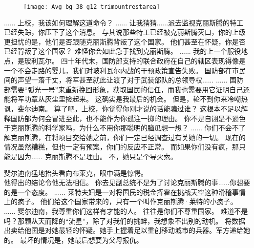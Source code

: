 \documentclass[openany]{book}
\begin{document}
\begin{figure}[h]
    \centering
    \texttt{[image: Avg\_bg\_38\_g12\_trimountrestarea]}
\end{figure}
\begin{dialogue}
     ......
     上校，我该如何理解这道命令？
     ......
     让我猜猜......派去监视克丽斯腾的特工已经失踪，你压下了这个消息。
     与其说那些特工已经被克丽斯腾灭口，你的上级更担忧的是，他们是否跟随克丽斯腾背叛了这个国家。
     他们甚至在怀疑，你是否已经背叛了这个国家？
     难怪你会如此急于找到克丽斯腾。
     ......
     我的上一个服役地点，是玻利瓦尔。
     四十年代末，国防部支持的联合政府在自己的辖区表现得像是一个不会走路的婴儿，我们对玻利瓦尔内战的干预政策宣告失败。
     国防部在市民间的声望一落千丈，将军甚至就此让渡了对于武装部队的总领导权......
     ......
     国防部需要“弧光一号”来重新挽回形象，获取国民的信任，而我也需要用它证明自己还能将军功章从灰尘里捡起来。
     这确实是我最后的机会。
     但是，轮不到你来冷嘲热讽，斐尔迪南。
     算了吧，上校，你觉得你刚才说的话能骗过谁？
     这根本不足以解释国防部为何会冒进至此，也不能作为你孤注一掷的理由。
     你不是自诩是不逊色于克丽斯腾的科学家吗，为什么不用你那聪明的脑瓜想一想？
     ......
     你们不会不了解克丽斯腾，在将项目交给她之前，你们一定已经调查过有关她的一切。
     现在的情况虽然糟糕，但也一定有预案，你们的反应不正常。
     而如果你们没有疯，那只能是因为......
     克丽斯腾不是理由。
     不，她只是个导火索。\par
    斐尔迪南猛地抬头看向布莱克，眼中满是惊愕。\\
    他得出的结论令他无法相信。
     你去见副总统不是为了讨论克丽斯腾的事......你想要的是一个态度。
     ......
     莱特夫妇是一对将国民的税金挥霍在挑战天空这种滑稽事情上的疯子。
     他们给这个国家带来的，只有一个叫作克丽斯腾·莱特的小疯子。
     ......
     斐尔迪南，我尊重你们这样有才能的人。
     往往是你们不尊重国家。
     难道不是吗？那颗从天而降的“流星”，除了对我们的挑衅，我想象不出别的动机。
     将数据出卖给他国是对她最轻的怀疑。她手上握着足以重创移动城市的兵器。军方递给她的。
     最坏的情况是，她最后想要为父母报仇。

\end{dialogue}
\end{document}
